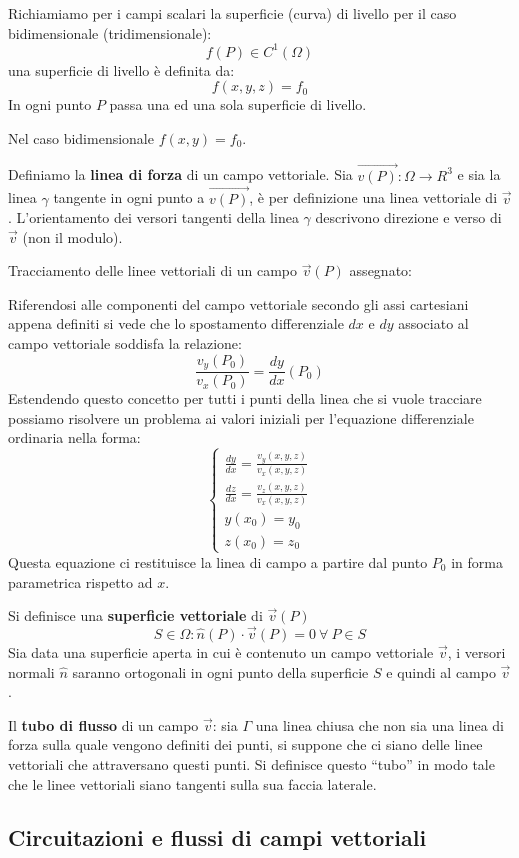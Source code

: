 Richiamiamo per i campi scalari la superficie (curva) di livello per il caso bidimensionale 
(tridimensionale):
$$
f(P) \in C^1(\Omega)
$$
una superficie di livello è definita da:
$$
f(x,y,z) = f_0
$$
In ogni punto $P$ passa una ed una sola superficie di livello.

Nel caso bidimensionale $f(x,y) = f_0$.


Definiamo la \textbf{linea di forza} di un campo vettoriale.
Sia $\vec{v(P)} : \Omega \to R^3$ e sia la linea $\gamma$ tangente in ogni punto a $\vec{v(P)}$,
è per definizione una linea vettoriale di $\vec{v}$.
L'orientamento dei versori tangenti della linea $\gamma$ descrivono direzione e verso di $\vec{v}$ 
(non il modulo).

Tracciamento delle linee vettoriali di un campo $\vec{v}(P)$ assegnato:

Riferendosi alle componenti del campo vettoriale secondo gli assi cartesiani appena definiti
si vede che lo spostamento differenziale $dx$ e $dy$ associato al campo vettoriale soddisfa la 
relazione:
$$
\frac{v_y(P_0)}{v_x(P_0)} = \frac{dy}{dx}(P_0)
$$
Estendendo questo concetto per tutti i punti della linea che si vuole tracciare
possiamo risolvere un problema ai valori iniziali per l'equazione differenziale ordinaria nella
forma:
$$
\begin{cases}
\frac{dy}{dx} = \frac{v_y(x,y,z)}{v_x(x,y,z)} \\
\frac{dz}{dx} = \frac{v_z(x,y,z)}{v_x(x,y,z)}\\
y(x_0) = y_0 \\
z(x_0) = z_0
\end{cases}
$$
Questa equazione ci restituisce la linea di campo a partire dal punto $P_0$ in forma parametrica
rispetto ad $x$.

Si definisce una \textbf{superficie vettoriale} di $\vec{v}(P)$
$$
S\in \Omega: \hat{n}(P)\cdot\vec{v}(P) = 0\ \forall\ P \in S
$$
Sia data una superficie aperta in cui è contenuto un campo vettoriale $\vec{v}$,
i versori normali $\hat{n}$ saranno ortogonali in ogni punto della superficie $S$ e quindi al 
campo $\vec{v}$.

Il \textbf{tubo di flusso} di un campo $\vec{v}$: 
sia $\Gamma$ una linea chiusa che non sia una linea di forza
sulla quale vengono definiti dei punti, si suppone che ci siano delle linee vettoriali che attraversano
questi punti. Si definisce questo ``tubo'' in modo tale che le linee vettoriali siano tangenti sulla sua faccia laterale.
\newpage
\subsection{Circuitazioni e flussi di campi vettoriali}

